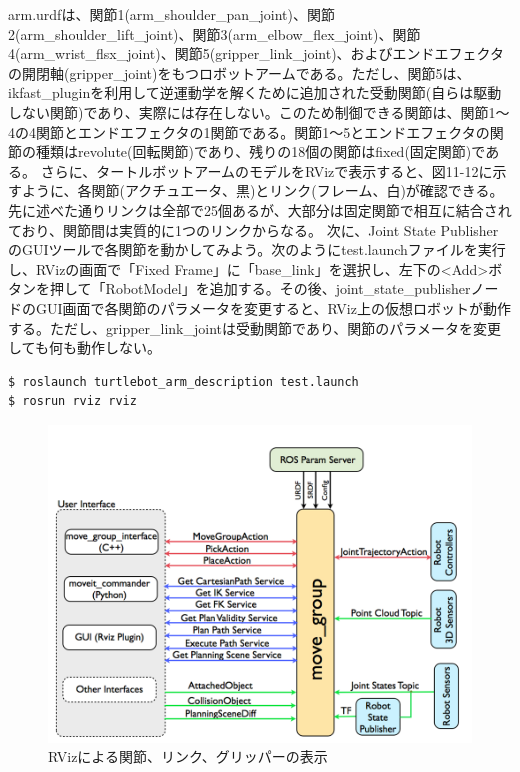 arm.urdfは、関節1(arm\_shoulder\_pan\_joint)、関節2(arm\_shoulder\_lift\_joint)、関節3(arm\_elbow\_flex\_joint)、関節4(arm\_wrist\_flsx\_joint)、関節5(gripper\_link\_joint)、およびエンドエフェクタの開閉軸(gripper\_joint)をもつロボットアームである。ただし、関節5は、ikfast\_pluginを利用して逆運動学を解くために追加された受動関節(自らは駆動しない関節)であり、実際には存在しない。このため制御できる関節は、関節1～4の4関節とエンドエフェクタの1関節である。関節1〜5とエンドエフェクタの関節の種類はrevolute(回転関節)であり、残りの18個の関節はfixed(固定関節)である。
さらに、タートルボットアームのモデルをRVizで表示すると、図11-12に示すように、各関節(アクチュエータ、黒)とリンク(フレーム、白)が確認できる。先に述べた通りリンクは全部で25個あるが、大部分は固定関節で相互に結合されており、関節間は実質的に1つのリンクからなる。
次に、Joint State PublisherのGUIツールで各関節を動かしてみよう。次のようにtest.launchファイルを実行し、RVizの画面で「Fixed Frame」に「base\_link」を選択し、左下の<Add>ボタンを押して「RobotModel」を追加する。その後、joint\_state\_publisherノードのGUI画面で各関節のパラメータを変更すると、RViz上の仮想ロボットが動作する。ただし、gripper\_link\_jointは受動関節であり、関節のパラメータを変更しても何も動作しない。

\begin{lstlisting}[language=ROS]
$ roslaunch turtlebot_arm_description test.launch
$ rosrun rviz rviz
\end{lstlisting}

\begin{figure}[ht]
  \centering
  \includegraphics[width=\columnwidth]{pictures/chapter11/pic_11_12.png}
  \caption{RVizによる関節、リンク、グリッパーの表示}
\end{figure}

